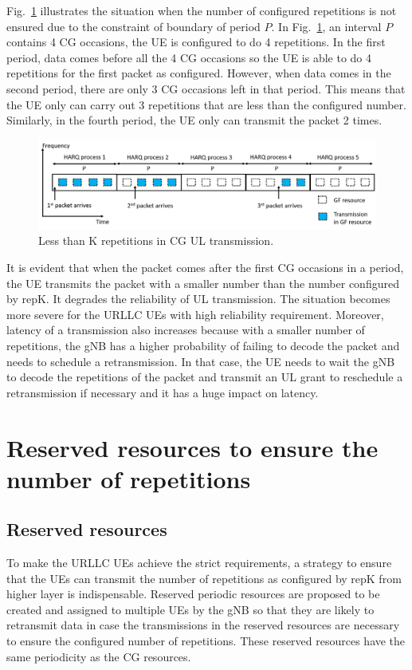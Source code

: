 \documentclass{report}
\begin{document}
Fig.~\ref{fig16} illustrates the situation when the number of configured repetitions is not ensured due to the constraint of boundary of period $P$. In Fig.~\ref{fig16}, an interval $P$ contains 4 CG occasions, the UE is configured to do 4 repetitions. In the first period, data comes before all the 4 CG occasions so the UE is able to do 4 repetitions for the first packet as configured. However, when data comes in the second period, there are only 3 CG occasions left in that period. This means that the UE only can carry out 3 repetitions that are less than the configured number. Similarly, in the fourth period, the UE only can transmit the packet 2 times.
\begin{figure}[htbp]
\centerline{\includegraphics[scale=0.27]{fig16.png}}
\caption{Less than K repetitions in CG UL transmission.}
\label{fig16}
\end{figure}

It is evident that when the packet comes after the first CG occasions in a period, the UE transmits the packet with a smaller number than the number configured by repK. It degrades the reliability of UL transmission. The situation becomes more severe for the URLLC UEs with high reliability requirement. Moreover, latency of a transmission also increases because with a smaller number of repetitions, the gNB has a higher probability of failing to decode the packet and needs to schedule a retransmission. In that case, the UE needs to wait the gNB to decode the repetitions of the packet and transmit an UL grant to reschedule a retransmission if necessary and it has a huge impact on latency.

\section{Reserved resources to ensure the number of repetitions} \label{32}
\subsection{Reserved resources}
To make the URLLC UEs achieve the strict requirements, a strategy to ensure that the UEs can transmit the number of repetitions as configured by repK from higher layer is indispensable. Reserved periodic resources are proposed to be created and assigned to multiple UEs by the gNB so that they are likely to retransmit data in case the transmissions in the reserved resources are necessary to ensure the configured number of repetitions. These reserved resources have the same periodicity as the CG resources.
\end{document}
